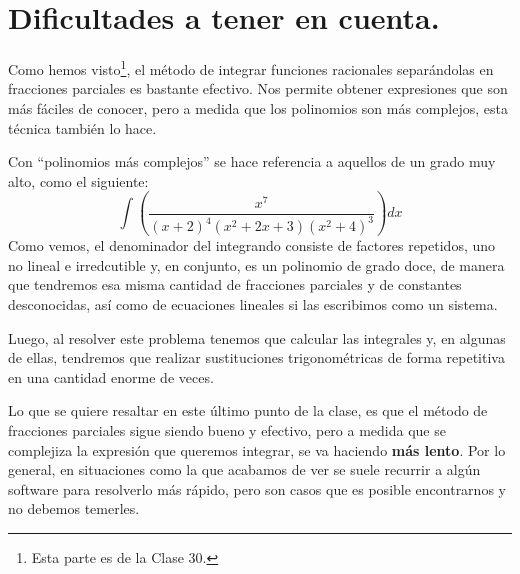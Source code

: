 \documentclass[12pt]{article}
\begin{document}
\section{Dificultades a tener en cuenta.}

Como hemos visto\footnote{Esta parte es de la Clase 30.}, el método de integrar funciones racionales separándolas en fracciones parciales es bastante efectivo. Nos permite obtener expresiones que son más fáciles de conocer, pero a medida que los polinomios son más complejos, esta técnica también lo hace.

Con ``polinomios más complejos'' se hace referencia a aquellos de un grado muy alto, como el siguiente:
\[
  \int \left(\frac{x^{7}}{(x + 2)^{4}(x^{2} + 2x + 3)(x^{2} + 4)^{3}}\right) dx
\]
Como vemos, el denominador del integrando consiste de factores repetidos, uno no lineal e irredcutible y, en conjunto, es un polinomio de grado doce, de manera que tendremos esa misma cantidad de fracciones parciales y de constantes desconocidas, así como de ecuaciones lineales si las escribimos como un sistema.

Luego, al resolver este problema tenemos que calcular las integrales y, en algunas de ellas, tendremos que realizar sustituciones trigonométricas de forma repetitiva en una cantidad enorme de veces.

Lo que se quiere resaltar en este último punto de la clase, es que el método de fracciones parciales sigue siendo bueno y efectivo, pero a medida que se complejiza la expresión que queremos integrar, se va haciendo \textbf{más lento}. Por lo general, en situaciones como la que acabamos de ver se suele recurrir a algún software para resolverlo más rápido, pero son casos que es posible encontrarnos y no debemos temerles.
\end{document}
